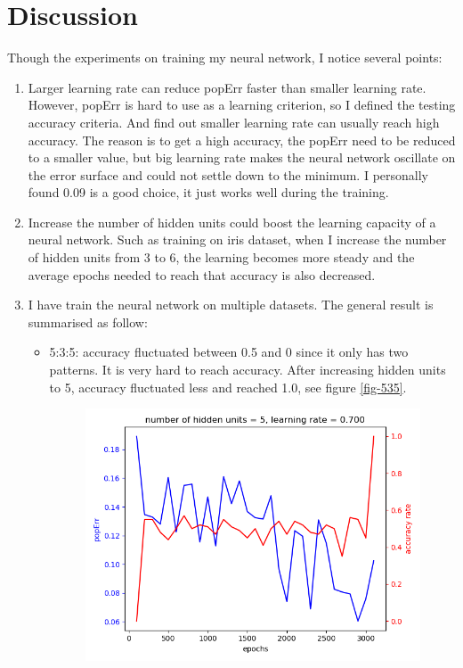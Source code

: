\documentclass[11pt]{article}
\begin{document}
\section{Discussion}
\label{sec-4}
Though the experiments on training my neural network, I notice several points:
\begin{enumerate}
\item Larger learning rate can reduce popErr faster than smaller learning rate. However, popErr is hard to use as a learning criterion, so I defined the testing accuracy criteria. And find out smaller learning rate can usually reach high accuracy. The reason is to get a high accuracy, the popErr need to be reduced to a smaller value, but big learning rate makes the neural network oscillate on the error surface and could not settle down to the minimum. I personally found 0.09 is a good choice, it just works well during the training.
\item Increase the number of hidden units could boost the learning capacity of a neural network. Such as training on iris dataset, when I increase the number of hidden units from 3 to 6, the learning becomes more steady and the average epochs needed to reach that accuracy is also decreased.
\item I have train the neural network on multiple datasets. The general result is summarised as follow:
\begin{itemize}
\item 5:3:5: accuracy fluctuated between 0.5 and 0 since it only has two patterns. It is very hard to reach accuracy. After increasing hidden units to 5, accuracy fluctuated less and reached 1.0, see figure \ref{fig-535}.
\begin{figure}[htb]
\centering
\includegraphics[width=.9\linewidth]{./popErr_vs_accuracy_on_535.png}

\end{figure}
\end{itemize}
\end{enumerate}
\end{document}
